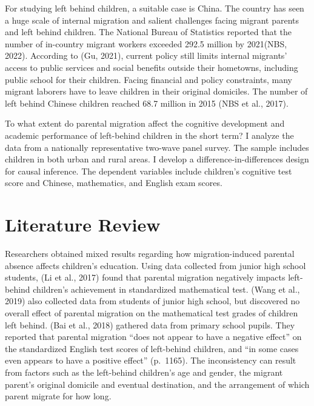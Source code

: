 \documentclass[
  man]{apa7}
\begin{document}
For studying left behind children, a suitable case is China. The country has seen a huge scale of internal migration and salient challenges facing migrant parents and left behind children. The National Bureau of Statistics reported that the number of in-country migrant workers exceeded 292.5 million by 2021(NBS, 2022). According to (Gu, 2021), current policy still limits internal migrants' access to public services and social benefits outside their hometowns, including public school for their children. Facing financial and policy constraints, many migrant laborers have to leave children in their original domiciles. The number of left behind Chinese children reached 68.7 million in 2015 (NBS et al., 2017).

To what extent do parental migration affect the cognitive development and academic performance of left-behind children in the short term? I analyze the data from a nationally representative two-wave panel survey. The sample includes children in both urban and rural areas. I develop a difference-in-differences design for causal inference. The dependent variables include children's cognitive test score and Chinese, mathematics, and English exam scores.

\hypertarget{literature-review}{%
\section{Literature Review}\label{literature-review}}

Researchers obtained mixed results regarding how migration-induced parental absence affects children's education. Using data collected from junior high school students, (Li et al., 2017) found that parental migration negatively impacts left-behind children's achievement in standardized mathematical test. (Wang et al., 2019) also collected data from students of junior high school, but discovered no overall effect of parental migration on the mathematical test grades of children left behind. (Bai et al., 2018) gathered data from primary school pupils. They reported that parental migration ``does not appear to have a negative effect'' on the standardized English test scores of left-behind children, and ``in some cases even appears to have a positive effect'' (p.~1165). The inconsistency can result from factors such as the left-behind children's age and gender, the migrant parent's original domicile and eventual destination, and the arrangement of which parent migrate for how long.
\end{document}
